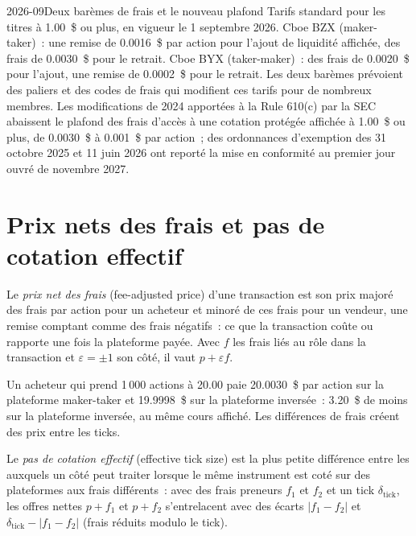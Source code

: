 \begin{dated}{2026-09}{Deux barèmes de frais et le nouveau plafond}\label{dat:mx:fees-rebates-and-venue-economics:cboe}
Tarifs standard pour les titres à 1.00~\$ ou plus, en vigueur le 1 septembre 2026. Cboe BZX (maker-taker)~: une remise de 0.0016~\$ par action pour l'ajout
de liquidité affichée, des frais de 0.0030~\$ pour le retrait. Cboe BYX (taker-maker)~: des frais de 0.0020~\$ pour l'ajout, une remise de 0.0002~\$ pour le retrait.
Les deux barèmes prévoient des paliers et des codes de frais qui modifient ces tarifs pour de nombreux membres. Les modifications de 2024 apportées à la Rule 610(c) par la SEC abaissent le plafond des frais d'accès
à une cotation protégée affichée à 1.00~\$ ou plus, de 0.0030~\$ à 0.001~\$ par action~; des ordonnances d'exemption des 31 octobre 2025 et 11 juin 2026 ont reporté la mise en conformité au
premier jour ouvré de novembre 2027.
\end{dated}

\section{Prix nets des frais et pas de cotation effectif}

\begin{definition}\label{def:mx:fees-rebates-and-venue-economics:adjusted}
Le \emph{prix net des frais} (fee-adjusted price) d'une transaction est son prix majoré des frais par action pour un acheteur et minoré de ces frais pour un vendeur, une remise
comptant comme des frais négatifs~: ce que la transaction coûte ou rapporte une fois la plateforme payée. Avec $f$ les frais liés au rôle dans la transaction et $\varepsilon=\pm1$ son côté,
il vaut $p+\varepsilon f$.
\end{definition}

Un acheteur qui prend 1\,000 actions à 20.00 paie 20.0030~\$ par action sur la plateforme maker-taker et 19.9998~\$ sur la plateforme inversée~: 3.20~\$ de moins
sur la plateforme inversée, au même cours affiché. Les différences de frais créent des prix entre les ticks.

\begin{definition}\label{def:mx:fees-rebates-and-venue-economics:efftick}
Le \emph{pas de cotation effectif} (effective tick size) est la plus petite différence entre les  auxquels un côté peut traiter
lorsque le même instrument est coté sur des plateformes aux frais différents~: avec des frais preneurs $f_1$ et $f_2$ et un tick $\delta_{\mathrm{tick}}$, les offres
nettes $p+f_1$ et $p+f_2$ s'entrelacent avec des écarts $|f_1-f_2|$ et $\delta_{\mathrm{tick}}-|f_1-f_2|$ (frais réduits modulo le tick).
\end{definition}


